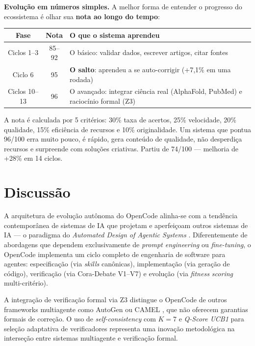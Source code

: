 \documentclass[
  article,
  12pt,
  oneside,
  a4paper,
  brazil,
  sumario=tradicional
]{abntex2}
\begin{document}
\begin{leigosbox}
\textbf{Evolução em números simples.} A melhor forma de entender o progresso do ecossistema é olhar sua \textbf{nota ao longo do tempo}:

\begin{center}
\footnotesize
\begin{tabular}{c|c|p{6cm}}
\hline
\textbf{Fase} & \textbf{Nota} & \textbf{O que o sistema aprendeu} \\
\hline
Ciclos 1--3 & 85--92 & O básico: validar dados, escrever artigos, citar fontes \\
Ciclo 6     & 95     & \textbf{O salto}: aprendeu a se auto-corrigir (+7,1\% em uma rodada) \\
Ciclos 10--13 & 96  & O avançado: integrar ciência real (AlphaFold, PubMed) e raciocínio formal (Z3) \\
\hline
\end{tabular}
\end{center}

\noindent\small A nota é calculada por 5 critérios: 30\% taxa de acertos, 25\% velocidade, 20\% qualidade, 15\% eficiência de recursos e 10\% originalidade. Um sistema que pontua 96/100 erra muito pouco, é rápido, gera conteúdo de qualidade, não desperdiça recursos e surpreende com soluções criativas. Partiu de 74/100 --- melhoria de +28\% em 14 ciclos.
\end{leigosbox}

\section{Discussão}

A arquitetura de evolução autônoma do OpenCode alinha-se com a tendência contemporânea de sistemas de IA que projetam e aperfeiçoam outros sistemas de IA --- o paradigma do \emph{Automated Design of Agentic Systems} \cite{hu2024adas}. Diferentemente de abordagens que dependem exclusivamente de \emph{prompt engineering} ou \emph{fine-tuning}, o OpenCode implementa um ciclo completo de engenharia de software para agentes: especificação (via \emph{skills} canônicas), implementação (via geração de código), verificação (via Cora-Debate V1--V7) e evolução (via \emph{fitness scoring} multi-critério).

A integração de verificação formal via Z3 \cite{demoura2008z3} distingue o OpenCode de outros frameworks multiagente como AutoGen \cite{wu2023autogen} ou CAMEL \cite{li2023camel}, que não oferecem garantias formais de correção. O uso de \emph{self-consistency} com $K=7$ e \emph{Q-Score UCB1} para seleção adaptativa de verificadores representa uma inovação metodológica na interseção entre sistemas multiagente e verificação formal.
\end{document}

